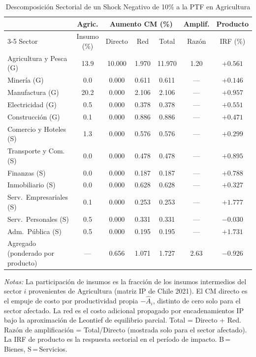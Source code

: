 \begin{table}[htbp]
\centering
\caption{Descomposición Sectorial de un Shock Negativo de 10\% a la PTF en Agricultura}
\label{tab:agr_decomp}
\begin{threeparttable}
\small
\begin{tabular}{@{}l c c c c c c@{}}
\toprule
 & Agric. & \multicolumn{3}{c}{Aumento CM (\%)} & Amplif. & Producto \\
\cmidrule(lr){3-5}
Sector & Insumo (\%) & Directo & Red & Total & Razón & IRF (\%) \\
\midrule
Agricultura y Pesca (G) & 13.9 & 10.000 & 1.970 & 11.970 &  1.20 & $+0.561$ \\
Minería (G) &  0.0 & 0.000 & 0.611 & 0.611 & --- & $+0.146$ \\
Manufactura (G) & 20.2 & 0.000 & 2.106 & 2.106 & --- & $+0.957$ \\
Electricidad (G) &  0.5 & 0.000 & 0.378 & 0.378 & --- & $+0.551$ \\
Construcción (G) &  0.1 & 0.000 & 0.886 & 0.886 & --- & $+0.471$ \\
Comercio y Hoteles (S) &  1.3 & 0.000 & 0.576 & 0.576 & --- & $+0.299$ \\
Transporte y Com. (S) &  0.0 & 0.000 & 0.478 & 0.478 & --- & $+0.895$ \\
Finanzas (S) &  0.0 & 0.000 & 0.187 & 0.187 & --- & $+0.788$ \\
Inmobiliario (S) &  0.0 & 0.000 & 0.628 & 0.628 & --- & $+0.327$ \\
Serv.\ Empresariales (S) &  0.1 & 0.000 & 0.253 & 0.253 & --- & $+1.777$ \\
Serv.\ Personales (S) &  0.5 & 0.000 & 0.331 & 0.331 & --- & $-0.030$ \\
Adm.\ Pública (S) &  0.5 & 0.000 & 0.195 & 0.195 & --- & $+1.731$ \\
\midrule
Agregado (ponderado por producto) & --- & 0.656 & 1.071 & 1.727 &  2.63 & $-0.926$ \\
\bottomrule
\end{tabular}
\begin{tablenotes}[flushleft]
\footnotesize
\item \textit{Notas:} La participación de insumos es la fracción de los insumos intermedios del sector $i$ provenientes de Agricultura (matriz IP de Chile 2021). El CM directo es el empuje de costo por productividad propia $-\hat A_i$, distinto de cero solo para el sector afectado. La red es el costo adicional propagado por encadenamientos IP bajo la aproximación de Leontief de equilibrio parcial. Total = Directo + Red. Razón de amplificación = Total/Directo (mostrada solo para el sector afectado). La IRF de producto es la respuesta sectorial en el período de impacto. B\,=\,Bienes, S\,=\,Servicios.
\end{tablenotes}
\end{threeparttable}
\end{table}
